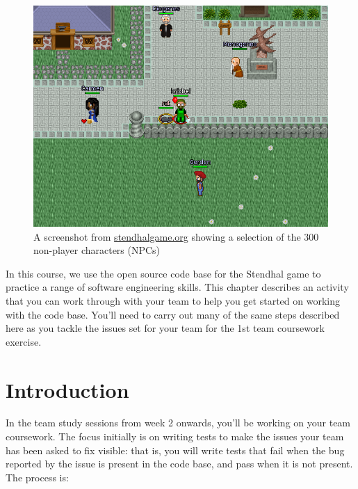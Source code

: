 \documentclass[
]{book}
\begin{document}
\begin{figure}

{\centering \includegraphics[width=0.75\linewidth]{images/Semos_City_NPCs-2020} 

}

\caption{A screenshot from \href{https://stendhalgame.org/}{stendhalgame.org} showing a selection of the 300 non-player characters (NPCs)}\label{fig:stendhalgame-fig}
\end{figure}



In this course, we use the open source code base for the Stendhal game to practice a range of software engineering skills. This chapter describes an activity that you can work through with your team to help you get started on working with the code base. You'll need to carry out many of the same steps described here as you tackle the issues set for your team for the 1st team coursework exercise.

\hypertarget{introduction-2}{%
\section{Introduction}\label{introduction-2}}

In the team study sessions from week 2 onwards, you'll be working on your team coursework. The focus initially is on writing tests to make the issues your team has been asked to fix visible: that is, you will write tests that fail when the bug reported by the issue is present in the code base, and pass when it is not present. The process is:
\end{document}
